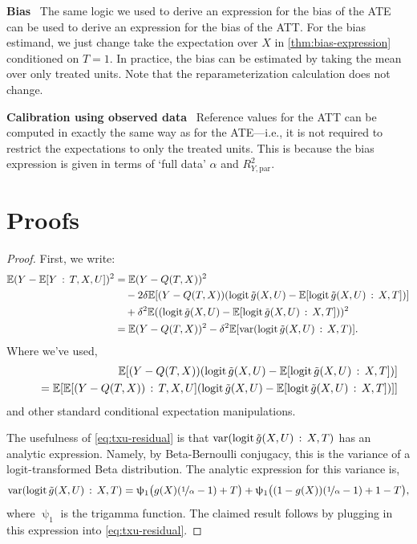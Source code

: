 \documentclass{article}
\DeclareRobustCommand{\parhead}[1]{\textbf{#1}~}
\newcommand{\digammafn}{\uppsi}
\begin{document}
\parhead{Bias} The same logic we used to derive an expression for the bias of the ATE
can be used to derive an expression for the bias of the ATT.
For the bias estimand, we just change 
take the expectation over $X$ in \cref{thm:bias-expression} conditioned on $T=1$.
In practice, the bias can be estimated by taking the mean over only treated units.
Note that the reparameterization calculation does not change.

\parhead{Calibration using observed data}
Reference values for the ATT can be computed in exactly the same way as for the ATE---i.e., it is not required to restrict the expectations to only the treated units.
This is because the bias expression is given in terms of `full data' $\alpha$ and $R_{Y,\mathrm{par}}^{2}$.

\section{Proofs}

\tpartrsq*
\begin{proof}
First, we write:
\begin{align}
\EE(Y-\EE[Y\given T,X,U])^{2} & =\EE(Y-Q(T,X))^{2}\nonumber \\
 & \quad-2\delta\EE[(Y-Q(T,X))(\logit\tilde{g}(X,U)-\EE[\logit\tilde{g}(X,U)\given X,T])]\nonumber \\
 & \quad+\delta^{2}\EE((\logit\tilde{g}(X,U)-\EE[\logit\tilde{g}(X,U)\given X,T]))^{2}\nonumber \\
 & =\EE(Y-Q(T,X))^{2}-\delta^{2}\EE[\var(\logit\tilde{g}(X,U)\given X,T)].\label{eq:txu-residual}
\end{align}
Where we've used, 
\begin{align*}
\EE[(Y-Q(T,X))(\logit\tilde{g}(X,U)-\EE[\logit\tilde{g}(X,U)\given X,T])]\\
\qquad=\EE[\EE[(Y-Q(T,X))\given T,X,U](\logit\tilde{g}(X,U)-\EE[\logit\tilde{g}(X,U)\given X,T])]]
\end{align*}
 and other standard conditional expectation manipulations. 

The usefulness of \cref{eq:txu-residual} is that $\var(\logit\tilde{g}(X,U)\given X,T)$
has an analytic expression.
Namely, by Beta-Bernoulli conjugacy, this is the variance of a logit-transformed Beta distribution.
The analytic expression for this variance is,
\[
  \var(\logit\tilde{g}(X,U)\given X,T) = \digammafn_1 \big(g(X)(\nicefrac{1}{\alpha}-1) + T\big) +
  \digammafn_1 \big((1-g(X))(\nicefrac{1}{\alpha}-1) + 1-T \big),
\]
where $\digammafn_1$ is the trigamma function.
The claimed result follows by plugging in this expression into \cref{eq:txu-residual}. 

\end{proof}
\end{document}
